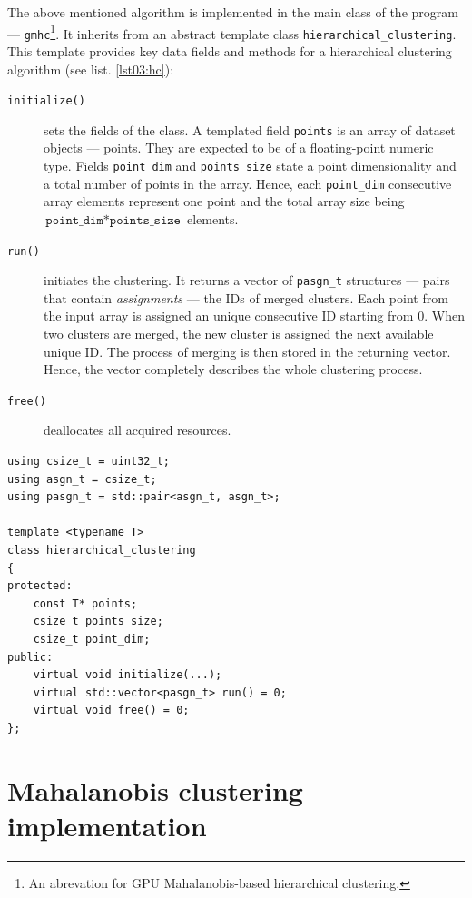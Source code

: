 The above mentioned algorithm is implemented in the main class of the program --- \texttt{gmhc}\footnote{An abrevation for GPU Mahalanobis-based hierarchical clustering.}. It inherits from an abstract template class \texttt{hierarchical\_clustering}.
This template provides key data fields and methods for a hierarchical clustering algorithm (see list. \ref{lst03:hc}): 

\begin{description}
	\item[\texttt{initialize()}] sets the fields of the class. A templated field \texttt{points} is an array of dataset objects --- points. They are expected to be of a floating-point numeric type. Fields \texttt{point\_dim} and \texttt{points\_size} state a point dimensionality and a total number of points in the array. Hence, each \texttt{point\_dim} consecutive array elements represent one point and the total array size being $\texttt{point\_dim}*\texttt{points\_size}$ elements.
	
	\item[\texttt{run()}] initiates the clustering. It returns a vector of \texttt{pasgn\_t} structures --- pairs that contain \emph{assignments} --- the IDs of merged clusters. Each point from the input array is assigned an unique consecutive ID starting from $0$. When two clusters are merged, the new cluster is assigned the next available unique ID. The process of merging is then stored in the returning vector. Hence, the vector completely describes the whole clustering process.
	
	\item[\texttt{free()}] deallocates all acquired resources.
\end{description}

\begin{lstlisting}[caption={A summary of \texttt{hierarchical\_clustering} header file.},label={lst03:hc}]
using csize_t = uint32_t;
using asgn_t = csize_t;
using pasgn_t = std::pair<asgn_t, asgn_t>;

template <typename T>
class hierarchical_clustering
{
protected:
	const T* points;
	csize_t points_size;
	csize_t point_dim;
public:
	virtual void initialize(...);
	virtual std::vector<pasgn_t> run() = 0;
	virtual void free() = 0;
};
\end{lstlisting}

\section{Mahalanobis clustering implementation}

